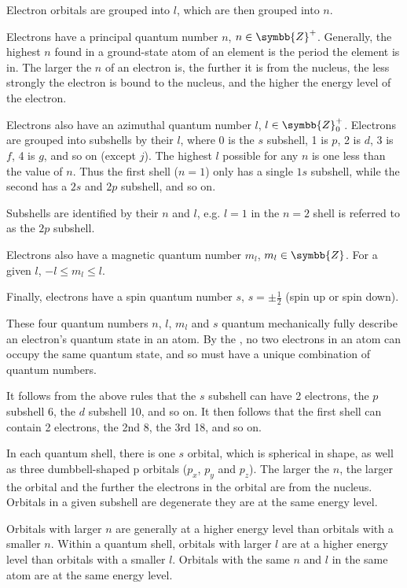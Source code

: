 \documentclass[Chemistry.tex]{subfiles}
\begin{document}
Electron orbitals are grouped into  \(l\), which are then grouped into  \(n\).

Electrons have a principal quantum number \(n\), \(n \in \symbb{Z}^+\). Generally, the highest \(n\) found in a ground-state atom of an element is the period the element is in. The larger the \(n\) of an electron is, the further it is from the nucleus, the less strongly the electron is bound to the nucleus, and the higher the energy level of the electron.

Electrons also have an azimuthal quantum number \(l\), \(l \in \symbb{Z}^+_0\). Electrons are grouped into subshells by their \(l\), where 0 is the \(s\) subshell, 1 is \(p\), 2 is \(d\), 3 is \(f\), 4 is \(g\), and so on (except \(j\)). The highest \(l\) possible for any \(n\) is one less than the value of \(n\). Thus the first shell (\(n=1\)) only has a single \(1s\) subshell, while the second has a \(2s\) and \(2p\) subshell, and so on.

Subshells are identified by their \(n\) and \(l\), e.g. \(l=1\) in the \(n=2\) shell is referred to as the \(2p\) subshell.

Electrons also have a magnetic quantum number \(m_l\), \(m_l \in \symbb{Z}\). For a given \(l\), \(-l \leq m_l \leq l\).

Finally, electrons have a spin quantum number \(s\), \(s = \pm\frac{1}{2}\) (spin up or spin down).

These four quantum numbers \(n\), \(l\), \(m_l\) and \(s\) quantum mechanically fully describe an electron's quantum state in an atom. By the , no two electrons in an atom can occupy the same quantum state, and so must have a unique combination of quantum numbers.

It follows from the above rules that the \(s\) subshell can have 2 electrons, the \(p\) subshell 6, the \(d\) subshell 10, and so on. It then follows that the first shell can contain 2 electrons, the 2nd 8, the 3rd 18, and so on.

In each quantum shell, there is one \(s\) orbital, which is spherical in shape, as well as three dumbbell-shaped p orbitals (\(p_x\), \(p_y\) and \(p_z\)). The larger the \(n\), the larger the orbital and the further the electrons in the orbital are from the nucleus. Orbitals in a given subshell are degenerate \slIE{} they are at the same energy level.

Orbitals with larger \(n\) are generally at a higher energy level than orbitals with a smaller \(n\). Within a quantum shell, orbitals with larger \(l\) are at a higher energy level than orbitals with a smaller \(l\). Orbitals with the same \(n\) and \(l\) in the same atom are at the same energy level.
\end{document}
